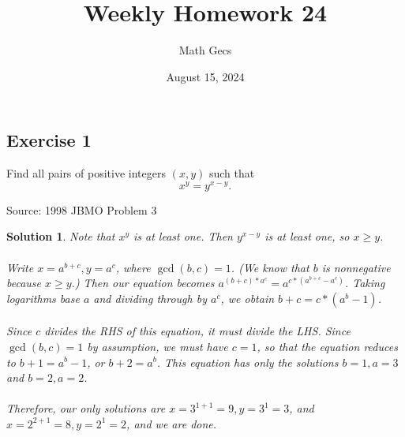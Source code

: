 \documentclass[12pt]{article}
\title{Weekly Homework 24}
\author{Math Gecs}
\date{August 15, 2024}
\newtheorem*{solution*}{Solution}
\begin{document}
\maketitle

\subsection*{Exercise 1}
Find all pairs of positive integers $(x,y)$ such that\[x^y = y^{x - y}.\]

Source: 1998 JBMO Problem 3\\

\begin{solution*}
Note that $x^y$ is at least one. Then $y^{x - y}$ is at least one, so $x \geq y$.
\\ \\
Write $x = a^{b+c}, y = a^c$, where $\gcd(b, c) = 1$. (We know that $b$ is nonnegative because $x\geq y$.) Then our equation becomes $a^{(b+c)*a^c} = a^{c*(a^{b+c} - a^c)}$. Taking logarithms base $a$ and dividing through by $a^c$, we obtain $b + c = c*(a^b - 1)$.
\\ \\
Since $c$ divides the RHS of this equation, it must divide the LHS. Since $\gcd(b, c) = 1$ by assumption, we must have $c = 1$, so that the equation reduces to $b + 1 = a^b - 1$, or $b + 2 = a^b$. This equation has only the solutions $b = 1, a = 3$ and $b = 2, a = 2$.
\\ \\
Therefore, our only solutions are $x = 3^{1 + 1} = 9, y = 3^1 = 3$, and $x = 2^{2+1} = 8, y = 2^1 = 2$, and we are done.
\end{solution*}
\end{document}
